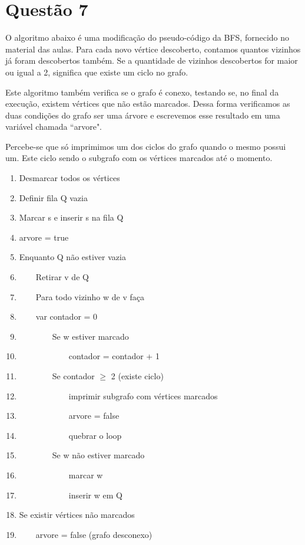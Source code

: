 \documentclass[a4paper,openright, 12pt]{article}
\begin{document}
\section*{Questão 7}
O algoritmo abaixo é uma modificação do pseudo-código da BFS, fornecido no material das aulas. Para cada novo vértice descoberto, contamos quantos vizinhos já foram descobertos também. Se a quantidade de vizinhos descobertos for maior ou igual a 2, significa que existe um ciclo no grafo. \par
Este algoritmo também verifica se o grafo é conexo, testando se, no final da execução, existem vértices que não estão marcados. Dessa forma verificamos as duas condições do grafo ser uma árvore e escrevemos esse resultado em uma variável chamada ``arvore". \par
Percebe-se que só imprimimos um dos ciclos do grafo quando o mesmo possui um. Este ciclo sendo o subgrafo com os vértices marcados até o momento.
\begin{enumerate}
    \item Desmarcar todos os vértices
    \item Definir fila Q vazia
    \item Marcar s e inserir s na fila Q
    \item arvore = true
    \item Enquanto Q não estiver vazia \par
    \item \ \ \ \ Retirar v de Q 
    \item \ \ \ \ Para todo vizinho w de v faça
    \item \ \ \ \ var contador = 0
    \item \ \ \ \ \ \ \ \ Se w estiver marcado
    \item \ \ \ \ \ \ \ \ \ \ \ \ contador = contador + 1
    \item \ \ \ \ \ \ \ \ Se contador $\geq$ 2 (existe ciclo)
    \item \ \ \ \ \ \ \ \ \ \ \ \ imprimir subgrafo com vértices marcados
    \item \ \ \ \ \ \ \ \ \ \ \ \ arvore = false
    \item \ \ \ \ \ \ \ \ \ \ \ \ quebrar o loop
    \item \ \ \ \ \ \ \ \ Se w não estiver marcado
    \item \ \ \ \ \ \ \ \ \ \ \ \ marcar w
    \item \ \ \ \ \ \ \ \ \ \ \ \ inserir w em Q
    \item Se existir vértices não marcados
    \item \ \ \ \  arvore = false (grafo desconexo)
    
    
    
\end{enumerate}
\end{document}
